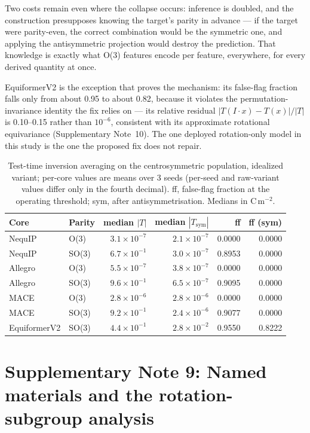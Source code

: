 Two costs remain even where the collapse occurs: inference is doubled, and the construction presupposes knowing the target's parity in advance --- if the target were parity-even, the correct combination would be the symmetric one, and applying the antisymmetric projection would destroy the prediction. That knowledge is exactly what O(3) features encode per feature, everywhere, for every derived quantity at once.

EquiformerV2 is the exception that proves the mechanism: its false-flag fraction falls only from about 0.95 to about 0.82, because it violates the permutation-invariance identity the fix relies on --- its relative residual $|T(I\!\cdot\!x) - T(x)|/|T|$ is 0.10--0.15 rather than $10^{-6}$, consistent with its approximate rotational equivariance (Supplementary Note~10). The one deployed rotation-only model in this study is the one the proposed fix does not repair.

\begin{table}[htbp]
\centering
\small
\caption{Test-time inversion averaging on the centrosymmetric population, idealized variant; per-core values are means over 3 seeds (per-seed and raw-variant values differ only in the fourth decimal). ff, false-flag fraction at the operating threshold; sym, after antisymmetrisation. Medians in C\,m$^{-2}$.}
\label{stab:e4}
\begin{tabular}{llrrrr}
\toprule
Core & Parity & median $|T|$ & median $|T_{\mathrm{sym}}|$ & ff & ff (sym) \\
\midrule
NequIP & O(3) & $3.1\times10^{-7}$ & $2.1\times10^{-7}$ & 0.0000 & 0.0000 \\
NequIP & SO(3) & $6.7\times10^{-1}$ & $3.0\times10^{-7}$ & 0.8953 & 0.0000 \\
Allegro & O(3) & $5.5\times10^{-7}$ & $3.8\times10^{-7}$ & 0.0000 & 0.0000 \\
Allegro & SO(3) & $9.6\times10^{-1}$ & $6.5\times10^{-7}$ & 0.9095 & 0.0000 \\
MACE & O(3) & $2.8\times10^{-6}$ & $2.8\times10^{-6}$ & 0.0000 & 0.0000 \\
MACE & SO(3) & $9.2\times10^{-1}$ & $2.4\times10^{-6}$ & 0.9077 & 0.0000 \\
EquiformerV2 & SO(3) & $4.4\times10^{-1}$ & $2.8\times10^{-2}$ & 0.9550 & 0.8222 \\
\bottomrule
\end{tabular}
\end{table}

\section*{Supplementary Note 9: Named materials and the rotation-subgroup analysis}

